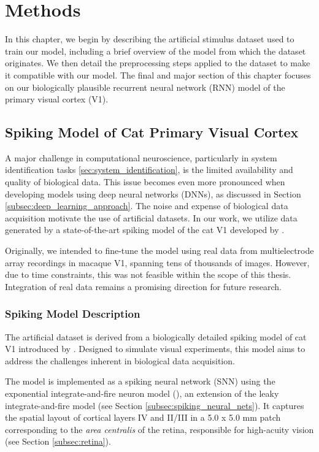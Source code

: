 \chapter{Methods}
\label{chap:methods}

In this chapter, we begin by describing the artificial stimulus dataset used to train our model, including a brief overview of the model from which the dataset originates. We then detail the preprocessing steps applied to the dataset to make it compatible with our model. The final and major section of this chapter focuses on our biologically plausible recurrent neural network (RNN) model of the primary visual cortex (V1).

\section{Spiking Model of Cat Primary Visual Cortex}
\label{sec:cats_model}
A major challenge in computational neuroscience, particularly in system identification tasks \ref{sec:system_identification}, is the limited availability and quality of biological data. This issue becomes even more pronounced when developing models using deep neural networks (DNNs), as discussed in Section \ref{subsec:deep_learning_approach}. The noise and expense of biological data acquisition motivate the use of artificial datasets. In our work, we utilize data generated by a state-of-the-art spiking model of the cat V1 developed by \citet{antolik2024comprehensive}.

Originally, we intended to fine-tune the model using real data from multielectrode array recordings in macaque V1, spanning tens of thousands of images. However, due to time constraints, this was not feasible within the scope of this thesis. Integration of real data remains a promising direction for future research.

\subsection{Spiking Model Description}
\label{subsec:spiking_model_description}

The artificial dataset is derived from a biologically detailed spiking model of cat V1 introduced by \citet{antolik2024comprehensive}. Designed to simulate visual experiments, this model aims to address the challenges inherent in biological data acquisition.

The model is implemented as a spiking neural network (SNN) using the exponential integrate-and-fire neuron model (\citet{FourcaudTrocm11628}), an extension of the leaky integrate-and-fire model (see Section \ref{subsec:spiking_neural_nets}). It captures the spatial layout of cortical layers IV and II/III in a 5.0 x 5.0 mm patch corresponding to the \emph{area centralis} of the retina, responsible for high-acuity vision (see Section \ref{subsec:retina}).

